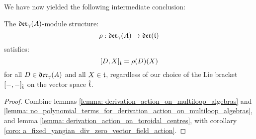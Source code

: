         We have now yielded the following intermediate conclusion:
        \begin{proposition} \label{prop: toroidal_lie_algebras_as_modules_over_div_zero_vector_field_lie_algebras}
            The $\mathfrak{der}_{\gamma}(A)$-module structure:
                $$\rho: \mathfrak{der}_{\gamma}(A) \to \mathfrak{der}(\mathfrak{t})$$
            satisfies:
                $$[D, X]_{\hat{\mathfrak{t}}} = \rho(D)(X)$$
            for all $D \in \mathfrak{der}_{\gamma}(A)$ and all $X \in \mathfrak{t}$, regardless of our choice of the Lie bracket $[-, -]_{\hat{\mathfrak{t}}}$ on the vector space $\hat{\mathfrak{t}}$.
        \end{proposition}
            \begin{proof}
                Combine lemmas \ref{lemma: derivation_action_on_multiloop_algebras} and \ref{lemma: no_polynomial_terms_for_derivation_action_on_multiloop_algebras}, and lemma \ref{lemma: derivation_action_on_toroidal_centres}, with corollary \ref{coro: a_fixed_yangian_div_zero_vector_field_action}.
            \end{proof}
            
